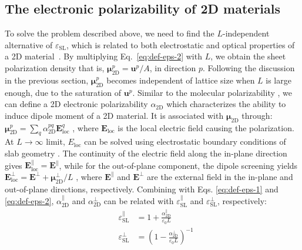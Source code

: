 \documentclass[journal=ancac3,manuscript=article,email=true,hyperref=true,keywords=false]{achemso}
\begin{document}
\subsection{The electronic polarizability of 2D materials}
\label{sec:electr-polar-2d}

To solve the problem described above, we need to find the
$L$-independent alternative of $\varepsilon_{\mathrm{SL}}$, which is
related to both electrostatic and optical properties of a 2D
material~\cite{Matthes_2016}. By multiplying Eq.~\ref{eq:def-eps-2}
with $L$, we obtain the sheet polarization density that is,
$\boldsymbol{\mu}_{\mathrm{2D}}^{p} =\boldsymbol{u}^{p}/A$, in
direction $p$. Following the discussion in the previous section,
$\boldsymbol{\mu}_{\mathrm{2D}}^{p}$ becomes independent of lattice
size when $L$ is large enough, due to the saturation of
$\boldsymbol{u}^{p}$.
%
Similar to the molecular polarizability \cite{Israelachvili_2011}, we
can define a 2D electronic polarizability $\alpha_{\mathrm{2D}}$ which
characterizes the ability to induce dipole moment of a 2D material. It
is associated with $\boldsymbol{\mu}_{\mathrm{2D}}$ through:
$\boldsymbol{\mu}_{\mathrm{2D}}^{p} = \sum_{q}
\alpha_{\mathrm{2D}}^{pq} \boldsymbol{E}_{\mathrm{loc}}^{q}$
\cite{T_bik_2004}, where $\boldsymbol{E}_{\mathrm{loc}}$ is the local
electric field causing the polarization. At $L \rightarrow \infty$
limit, $E_{\mathrm{loc}}$ can be solved using electrostatic boundary
conditions of slab geometry \cite{Markel_2016}. The continuity of the
electric field along the in-plane direction gives
$\boldsymbol{E}^{\parallel}_{\mathrm{loc}}=\boldsymbol{E}^{\parallel}$,
while for the out-of-plane component, the dipole screening yields
$\boldsymbol{E}_{\mathrm{loc}}^{\perp}=\boldsymbol{E}^{\perp}+\boldsymbol{\mu}_{\mathrm{2D}}^{\perp}/L$
\cite{Meyer_2001_dipole_slab,T_bik_2004}, where
$\boldsymbol{E}^{\parallel}$ and $\boldsymbol{E}^{\perp}$ are the
external field in the in-plane and out-of-plane directions,
respectively. Combining with Eqs. \ref{eq:def-eps-1} and
\ref{eq:def-eps-2},
$\alpha_{\mathrm{2D}}^{\parallel}$ and $\alpha_{\mathrm{2D}}^{\perp}$
can be related with $\varepsilon_{\mathrm{SL}}^{\parallel}$ and
$\varepsilon_{\mathrm{SL}}^{\perp}$, respectively:
%
%
\begin{subequations}
\begin{eqnarray}
  \label{eq:alpha-para-def}
  &\varepsilon_{\mathrm{SL}}^{\parallel} &= 1 + \frac{\alpha_{\mathrm{2D}}^{\parallel}}{\varepsilon_{0}L}\\
  \label{eq:alpha-perp-def}
  &\varepsilon_{\mathrm{SL}}^{\perp} &= \left(1 - {\displaystyle \frac{\alpha_{\mathrm{2D}}^{\perp}}{\varepsilon_{\mathrm{0}} L}} \right)^{-1}
\end{eqnarray}
\end{subequations}
\end{document}
